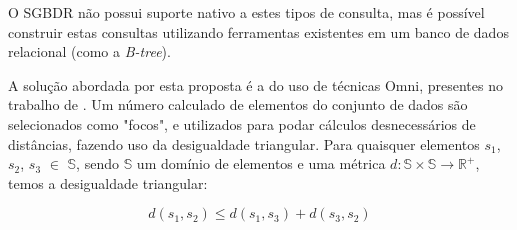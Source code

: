 O SGBDR não possui suporte nativo a estes tipos de consulta, mas é possível construir estas consultas utilizando ferramentas existentes em um banco de dados relacional (como a \textit{B-tree}).%



A solução abordada por esta proposta é a do uso de técnicas Omni, presentes no trabalho de \cite{Traina2001}. Um número calculado de elementos do conjunto de dados são selecionados como "focos", e utilizados para
podar cálculos desnecessários de distâncias, fazendo uso da desigualdade triangular. Para quaisquer elementos $s_1$, $s_2$, $s_3$ $\in$ $\mathbb{S}$, sendo $\mathbb{S}$ um domínio de elementos
e uma métrica $d : \mathbb{S} \times \mathbb{S} \rightarrow \mathbb{R^+}$, temos a desigualdade triangular: %

\begin{equation} \label{eq:destri}
		d(s_1,s_2) \leq d(s_1,s_3) + d(s_3,s_2)
\end{equation}

